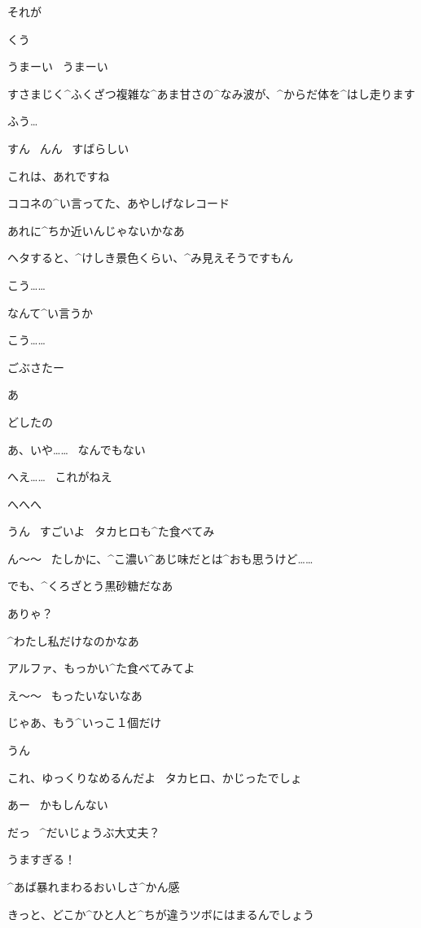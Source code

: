 \Alpha それが

\page[76]
\Alpha くう

\Alpha うまーい
\ うまーい

\Alpha すさまじく^{ふくざつ}{複雑}な^{あま}{甘}さの^{なみ}{波}が、^{からだ}{体}を^{はし}{走}ります

\page[77]
\Alpha ふう…

\Alpha すん
\ んん
\ すばらしい

\Alpha これは、あれですね

\Alpha ココネの^{い}{言}ってた、あやしげなレコード

\Alpha あれに^{ちか}{近}いんじゃないかなあ

\Alpha ヘタすると、^{けしき}{景色}くらい、^{み}{見}えそうですもん

\Alpha こう……

\Alpha なんて^{い}{言}うか

\Alpha こう……

\page[78]
\Takahiro ごぶさたー

\Alpha あ

\Takahiro どしたの

\Alpha あ、いや……
\ なんでもない

\page[79]
\Takahiro へえ……
\ これがねえ

\Alpha へへへ

\Alpha うん
\ すごいよ
\ タカヒロも^{た}{食}べてみ

\Takahiro ん〜〜
\ たしかに、^{こ}{濃}い^{あじ}{味}だとは^{おも}{思}うけど……

\Takahiro でも、^{くろざとう}{黒砂糖}だなあ

\Alpha ありゃ？

\page[80]
\Alpha ^{わたし}{私}だけなのかなあ

\Takahiro アルファ、もっかい^{た}{食}べてみてよ

\Alpha え〜〜
\ もったいないなあ

\Alpha じゃあ、もう^{いっこ}{１個}だけ

\Takahiro うん

\Alpha これ、ゆっくりなめるんだよ
\ タカヒロ、かじったでしょ

\Takahiro あー
\ かもしんない

\page[82]
\Takahiro だっ
\ ^{だいじょうぶ}{大丈夫}？

\Alpha うますぎる！

\page[83]
\Alpha ^{あば}{暴}れまわるおいしさ^{かん}{感}

\Alpha きっと、どこか^{ひと}{人}と^{ちが}{違}うツボにはまるんでしょう

